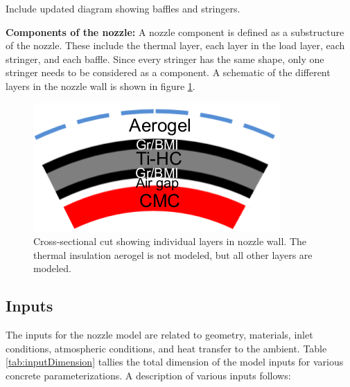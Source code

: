 \documentclass{article}
\begin{document}
{\color{red} Include updated diagram showing baffles and stringers.}

\begin{mdframed}
\textbf{Components of the nozzle:} A nozzle component is defined as a substructure of the nozzle. These include the thermal layer, each layer in the load layer, each stringer, and each baffle. Since every stringer has the same shape, only one stringer needs to be considered as a component. A schematic of the different layers in the nozzle wall is shown in figure \ref{fig:nozzleLayerSchematic}.
\end{mdframed}

\begin{figure}
\caption{Cross-sectional cut showing individual layers in nozzle wall. The thermal insulation aerogel is not modeled, but all other layers are modeled.}
\label{fig:nozzleLayerSchematic}
\begin{center}
\includegraphics[scale=0.5]{figs/layers.png}
\end{center}
\end{figure}

\subsection{Inputs}

The inputs for the nozzle model are related to geometry, materials, inlet conditions, atmospheric conditions, and heat transfer to the ambient. Table \ref{tab:inputDimension} tallies the total dimension of the model inputs for various concrete parameterizations. A description of various inputs follows:
\end{document}

